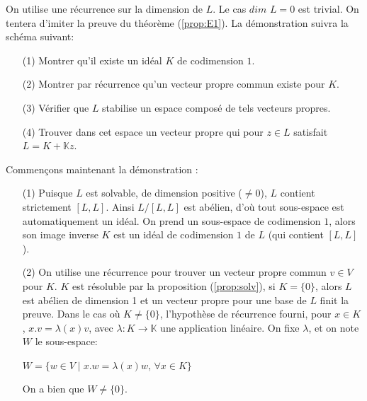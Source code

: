 \documentclass[a4paper,openany,12pt]{report}
\newcommand{\KK}{\mathbb{K}}
\theoremstyle{break}
{\theorembodyfont{\upshape}
\newtheorem*{rmq}{Remarque :}
\newtheorem*{prv}{Preuve :}
\newtheorem*{ex}{Exemples :}
\newtheorem*{exe}{Exemple : }
\newtheorem*{nota}{Notation :}
\newtheorem*{dem}{D\'emonstration :}}
\begin{document}
\begin{dem}
\quad On utilise une récurrence sur la dimension de $L$. 
Le cas $dim$ $L=0$ est trivial. 
On tentera d'imiter la preuve du théorème (\ref{prop:E1}). La démonstration suivra la schéma suivant:
\begin{itemize}
\item[(1)] Montrer qu'il existe un idéal $K$ de codimension $1$.
\item[(2)] Montrer par récurrence qu'un vecteur propre commun existe pour $K$.
\item[(3)] Vérifier que $L$ stabilise un espace composé de tels vecteurs propres.
\item[(4)] Trouver dans cet espace un vecteur propre qui pour $z \in L$ satisfait $L=K+\KK z$.
\end{itemize}
Commençons maintenant la démonstration :
\begin{itemize}
\item[(1)] Puisque $L$ est solvable, de dimension positive ($\neq  0$), $L$ contient strictement $[L,L]$. Ainsi $L/[L,L]$ est abélien, d'où tout sous-espace est automatiquement un idéal. On prend un sous-espace de codimension $1$, alors son image inverse $K$ est un idéal de codimension $1$ de $L$ (qui contient $[L,L]$).

\item[(2)] On utilise une récurrence pour trouver un vecteur propre commun $v \in V$ pour $K$. $K$ est résoluble par la proposition (\ref{prop:solv}), si $K = \{ 0 \}$, alors $L$ est abélien de dimension 1 et un vecteur propre pour une base de $L$ finit la preuve. Dans le cas où $K \neq \{ 0 \}$, l'hypothèse de récurrence fourni, pour $x \in K$, $x.v= \lambda(x)v$, avec $\lambda : K \to \KK$ une application linéaire. On fixe $\lambda$, et on note $W$ le sous-espace:
\begin{center}
$W=\{ w \in V \mid x.w= \lambda(x)w$, $\forall x \in K \} $
\end{center}
On a bien que $W \neq \{0\}$.


\end{itemize}
\end{dem}
\end{document}
